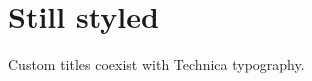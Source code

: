 \documentclass{article}
\begin{document}
\maketitle
\section{Still styled}
Custom titles coexist with Technica typography.
\end{document}
